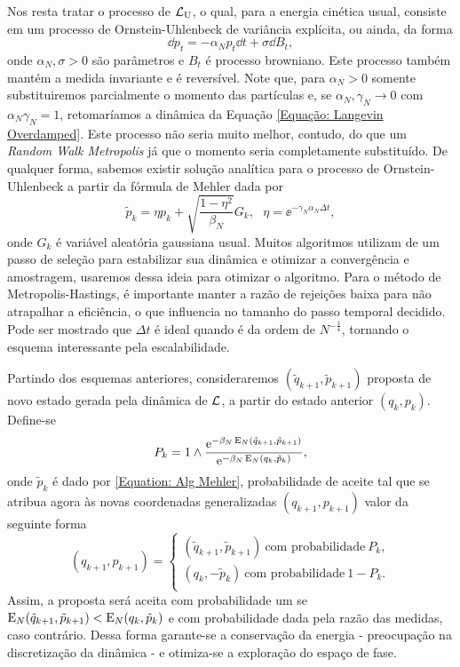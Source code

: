 \documentclass[12pt]{report}
\begin{document}
Nos resta tratar o processo de $\operatorname{\mathcal{L}}_{\operatorname{U}}$, o qual, para a energia cinética usual, consiste em um processo de Ornstein-Uhlenbeck de variância explícita, ou ainda, da forma $$\dd p_t = - \alpha_N p_t \dd t + \sigma \dd B_t,$$ onde $\alpha_N, \sigma > 0$ são parâmetros e $B_t$ é processo browniano. Este processo também mantém a medida invariante e é reversível. Note que, para $\alpha_N > 0$ somente substituiremos parcialmente o momento das partículas e, se $\alpha_N, \gamma_N \rightarrow 0$ com $\alpha_N \gamma_N = 1$, retomaríamos a dinâmica da Equação \eqref{Equação: Langevin Overdamped}. Este processo não seria muito melhor, contudo, do que um \textit{Random Walk Metropolis} já que o momento seria completamente substituído. \cite[Capítulo~5]{handbookmontecarlo} De qualquer forma, sabemos existir solução analítica para o processo de Ornstein-Uhlenbeck a partir da fórmula de Mehler dada por
\begin{equation}
	\tilde{p}_k = \eta p_k + \sqrt{\frac{1-\eta^2}{\beta_N}} G_k, \ \ \ \eta = \ee^{-\gamma_N \alpha_N \Delta t},
	\label{Equation: Mehler}
\end{equation}
onde $G_k$ é variável aleatória gaussiana usual. \cite{Chafa2018} Muitos algoritmos utilizam de um passo de seleção para estabilizar sua dinâmica e otimizar a convergência e amostragem, usaremos dessa ideia para otimizar o algoritmo. Para o método de Metropolis-Hastings, é importante manter a razão de rejeições baixa para não atrapalhar a eficiência, o que influencia no tamanho do passo temporal decidido. Pode ser mostrado que $\Delta t$ é ideal quando é da ordem de $N^{-\frac{1}{4}}$, \cite{Chafa2018} tornando o esquema interessante pela escalabilidade.

Partindo dos esquemas anteriores, consideraremos $(\tilde{q}_{k+1},\tilde{p}_{k+1})$ proposta de novo estado gerada pela dinâmica de $\operatorname{\mathcal{L}}$, a partir do estado anterior $(q_{k},p_{k})$. Define-se
\begin{equation}
	P_k = 1 \wedge \frac{\operatorname{\rm e}^{-\beta_N \operatorname{E}_N(\tilde{q}_{k+1}, \tilde{p}_{k+1})}}{\operatorname{\rm e}^{-\beta_N \operatorname{E}_N(q_{k}, \tilde{p}_{k})}},
	\label{Equation: Pk}
\end{equation}
onde $\tilde{p}_{k}$ é dado por \eqref{Equation: Alg Mehler}, probabilidade de aceite tal que se atribua agora às novas coordenadas generalizadas $(q_{k+1}, p_{k+1})$ valor da seguinte forma
\begin{equation}
	(q_{k+1}, p_{k+1}) =
	\begin{cases}
		(\tilde{q}_{k+1}, \tilde{p}_{k+1}) \ \text{com probabilidade} \ P_k, \\
		(q_k, -\tilde{p}_{k}) \ \text{com probabilidade} \ 1-P_k. \\
	\end{cases}
	\label{Equation: Metropolis}
\end{equation}
Assim, a proposta será aceita com probabilidade um se $\operatorname{E}_N(\tilde{q}_{k+1}, \tilde{p}_{k+1}) < \operatorname{E}_N(q_{k}, \tilde{p}_{k})$ e com probabilidade dada pela razão das medidas, caso contrário. Dessa forma garante-se a conservação da energia - preocupação na discretização da dinâmica - e otimiza-se a exploração do espaço de fase.
\end{document}
